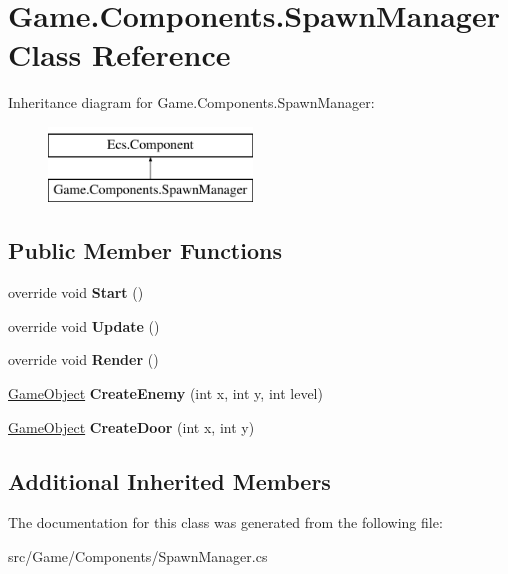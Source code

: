 \hypertarget{class_game_1_1_components_1_1_spawn_manager}{}\section{Game.\+Components.\+Spawn\+Manager Class Reference}
\label{class_game_1_1_components_1_1_spawn_manager}
Inheritance diagram for Game.\+Components.\+Spawn\+Manager\+:\begin{figure}[H]
\begin{center}
\leavevmode
\includegraphics[height=2.000000cm]{class_game_1_1_components_1_1_spawn_manager}
\end{center}
\end{figure}
\subsection*{Public Member Functions}
\begin{DoxyCompactItemize}
\item 
\mbox{\label{class_game_1_1_components_1_1_spawn_manager_ac81b1b98739121be3647956943ea7ccc}} 
override void {\bfseries Start} ()
\item 
\mbox{\label{class_game_1_1_components_1_1_spawn_manager_a86d9fad9c565c5e0adf713ced758c717}} 
override void {\bfseries Update} ()
\item 
\mbox{\label{class_game_1_1_components_1_1_spawn_manager_a9e824ce8907edb4487fbb52c23065893}} 
override void {\bfseries Render} ()
\item 
\mbox{\label{class_game_1_1_components_1_1_spawn_manager_aa178e4c7d6952bf876d20e6c2a8e4ffd}} 
\mbox{\hyperlink{class_ecs_1_1_game_object}{Game\+Object}} {\bfseries Create\+Enemy} (int x, int y, int level)
\item 
\mbox{\label{class_game_1_1_components_1_1_spawn_manager_ab42c59bd9c39ab52046e99f876261ed2}} 
\mbox{\hyperlink{class_ecs_1_1_game_object}{Game\+Object}} {\bfseries Create\+Door} (int x, int y)
\end{DoxyCompactItemize}
\subsection*{Additional Inherited Members}


The documentation for this class was generated from the following file\+:\begin{DoxyCompactItemize}
\item 
src/\+Game/\+Components/Spawn\+Manager.\+cs\end{DoxyCompactItemize}
